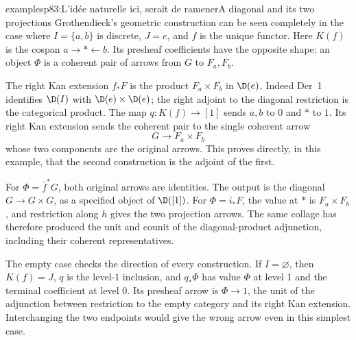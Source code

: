 \begin{dcomment}{examples}{p83:L'idée naturelle ici, serait de ramener}{A diagonal and its two projections}
Grothendieck's geometric construction can be seen completely in the case where \(I=\{a,b\}\) is discrete, \(J=e\), and \(f\) is the unique functor. Here \(K(f)\) is the cospan \(a\to *\leftarrow b\). Its presheaf coefficients have the opposite shape: an object \(\Phi\) is a coherent pair of arrows from \(G\) to \(F_a,F_b\).

The right Kan extension \(f_*F\) is the product \(F_a\times F_b\) in \(\D(e)\). Indeed Der~1 identifies \(\D(I)\) with \(\D(e)\times\D(e)\); the right adjoint to the diagonal restriction is the categorical product. The map \(q:K(f)\to[1]\) sends \(a,b\) to \(0\) and \(*\) to \(1\). Its right Kan extension sends the coherent pair to the single coherent arrow
\[
 G\longrightarrow F_a\times F_b
\]
whose two components are the original arrows. This proves directly, in this example, that the second construction is the adjoint of the first.

For \(\Phi=\bar f^*G\), both original arrows are identities. The output is the diagonal \(G\to G\times G\), as a specified object of \(\D([1])\). For \(\Phi=i_*F\), the value at \(*\) is \(F_a\times F_b\), and restriction along \(h\) gives the two projection arrows. The same collage has therefore produced the unit and counit of the diagonal-product adjunction, including their coherent representatives.

The empty case checks the direction of every construction. If \(I=\varnothing\), then \(K(f)=J\), \(q\) is the level-\(1\) inclusion, and \(q_*\Phi\) has value \(\Phi\) at level \(1\) and the terminal coefficient at level \(0\). Its presheaf arrow is \(\Phi\to1\), the unit of the adjunction between restriction to the empty category and its right Kan extension. Interchanging the two endpoints would give the wrong arrow even in this simplest case.
\end{dcomment}



